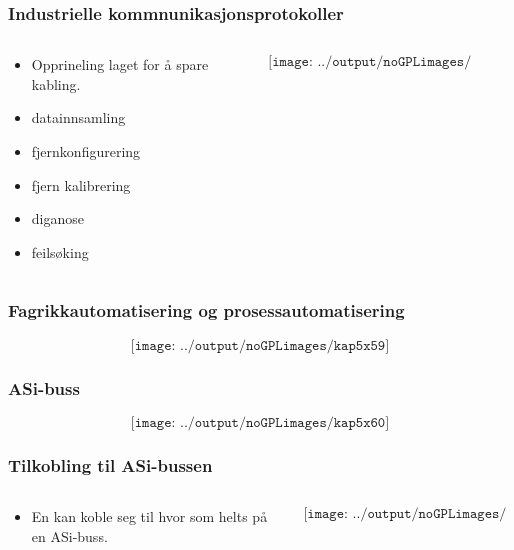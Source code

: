 \documentclass[aspectratio=169,xcolor=dvipsnames]{beamer}
\begin{document}
\begin{frame}
	\frametitle{Industrielle kommnunikasjonsprotokoller}
	\begin{columns}
		\begin{column}{0.5\textwidth}

			\begin{itemize}
				\item Opprineling laget for å spare kabling. 
				\item datainnsamling
				\item fjernkonfigurering
				\item fjern kalibrering
				\item diganose
				\item feilsøking
			\end{itemize}

			
		\end{column}

		\begin{column}{0.5\textwidth}
	$$\texttt{[image: ../output/noGPLimages/kap5x58]}$$
		\end{column}
	\end{columns}
\end{frame}
\begin{frame}
	\frametitle{Fagrikkautomatisering og prosessautomatisering}
	$$\texttt{[image: ../output/noGPLimages/kap5x59]}$$
\end{frame}
\begin{frame}
	\frametitle{ASi-buss}
	$$\texttt{[image: ../output/noGPLimages/kap5x60]}$$
\end{frame}
\begin{frame}
	\frametitle{Tilkobling til  ASi-bussen}
	\begin{columns}
		\begin{column}{0.5\textwidth}

			\begin{itemize}
				\item En kan koble seg til hvor som helts på en ASi-buss. 
			\end{itemize}

			
		\end{column}

		\begin{column}{0.5\textwidth}
	$$\texttt{[image: ../output/noGPLimages/kap5x61]}$$
		\end{column}
	\end{columns}
\end{frame}
\end{document}
